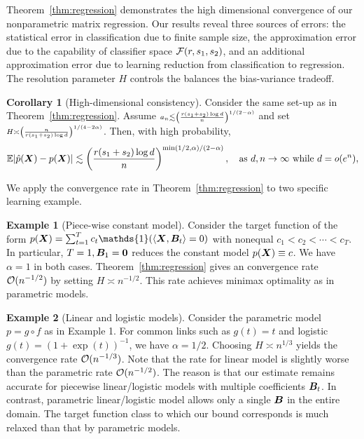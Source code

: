 \documentclass[11pt]{article}
\theoremstyle{definition}
\newtheorem{corollary}{Corollary}[section]
\newtheorem{example}{Example}
\begin{document}
Theorem~\ref{thm:regression} demonstrates the high dimensional convergence of our nonparametric matrix regression. Our results reveal three sources of errors: the statistical error in classification due to finite sample size, the approximation error due to the capability of classifier space $\mathcal{F}(r,s_1,s_2)$, and an additional approximation error due to learning reduction from classification to regression. The resolution parameter $H$ controls the balances the bias-variance tradeoff. 

\begin{corollary}[High-dimensional consistency] Consider the same set-up as in Theorem~\ref{thm:regression}. Assume $\scriptstyle a_n \lesssim \left({r(s_1+s_2)\log d \over n}\right)^{1/(2-\alpha)}$ and set $\scriptstyle H\asymp \left({n\over r(s_1+s_2) \log d}\right)^{1/(4-2\alpha)}$. Then, with high probability,
\begin{equation}\label{eq:final}
\mathbb{E}|\hat p(\bm X)- p(\bm X)| \lesssim \left({r(s_1+s_2)\log d \over n}\right)^{\min(1/2,\alpha)/(2-\alpha)}, \quad \text{as }d, n\to\infty \text{ while } d=o(e^{n}),
\end{equation}
\end{corollary}

We apply the convergence rate in Theorem~\ref{thm:regression} to two specific learning example.
\begin{example}[Piece-wise constant model] Consider the target function of the form $p(\mX)=\sum_{t=1}^T c_t\mathds{1}(\langle \mX, \mB_t \rangle=0)$ with nonequal $c_1< c_2<\cdots < c_T$. In particular, $T=1, \bm B_1=\bm{0}$ reduces the constant model $p(\bm X)\equiv c$. We have $\alpha=1$ in both cases. Theorem~\ref{thm:regression} gives an convergence rate $\mathcal{O}(n^{-1/2})$ by setting $H\asymp n^{-1/2}$. This rate achieves minimax optimality as in parametric models. 
\end{example}

\begin{example}[Linear and logistic models]
Consider the parametric model $p=g\circ f$ as in Example 1. For common links such as $g(t)=t$ and logistic $g(t)=(1+\exp(t))^{-1}$, we have $\alpha=1/2$. Choosing $H\asymp n^{1/3}$ yields the convergence rate $\mathcal{O}(n^{-1/3})$.  Note that the rate for linear model is slightly worse than the parametric rate $\mathcal{O}(n^{-1/2})$. The reason is that our estimate remains accurate for piecewise linear/logistic models with multiple coefficients $\bm B_t$. In contrast, parametric linear/logistic model allows only a single $\bm B$ in the entire domain. The target function class to which our bound corresponds is much relaxed than that by parametric models. %
\end{example}
\end{document}
